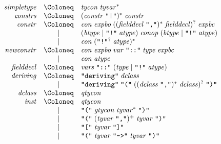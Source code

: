 \begin{align*}
  \begin{array}{rcl}
    \mathit{simpletype}
    & \Coloneq & \mathit{tycon}\; \mathit{tyvar}^* \\
    \mathit{constrs}
    & \Coloneq & (\mathit{constr}\; \text{\texttt{\textquotedbl|\textquotedbl}})^*\; \mathit{constr} \\
    \mathit{constr}
    & \Coloneq & \mathit{con}\; \mathit{expbo}\; ((\mathit{fielddecl}\; \text{\texttt{\textquotedbl,\textquotedbl}})^*\; \mathit{fielddecl})^?\; \mathit{expbc} \\
    & \mid & (\mathit{btype} \mid \text{\texttt{\textquotedbl!\textquotedbl}}\; \mathit{atype})\; \mathit{conop}\; (\mathit{btype} \mid \text{\texttt{\textquotedbl!\textquotedbl}}\; \mathit{atype}) \\
    & \mid & \mathit{con}\; (\text{\texttt{\textquotedbl!\textquotedbl}}^?\; \mathit{atype})^* \\
    \mathit{newconstr}
    & \Coloneq & \mathit{con}\; \mathit{expbo}\; \mathit{var}\; \text{\texttt{\textquotedbl ::\textquotedbl}}\; \mathit{type}\; \mathit{expbc} \\
    & \mid & \mathit{con}\; \mathit{atype} \\
    \mathit{fielddecl}
    & \Coloneq & \mathit{vars}\; \text{\texttt{\textquotedbl ::\textquotedbl}}\; (\mathit{type} \mid \text{\texttt{\textquotedbl !\textquotedbl}}\; \mathit{atype}) \\
    \mathit{deriving}
    & \Coloneq & \text{\texttt{\textquotedbl deriving\textquotedbl}}\; \mathit{dclass} \\
    & \mid & \text{\texttt{\textquotedbl deriving\textquotedbl}}\; \text{\texttt{\textquotedbl(\textquotedbl}}\; ((\mathit{dclass}\; \text{\texttt{\textquotedbl,\textquotedbl}})^*\; \mathit{dclass})^?\; \text{\texttt{\textquotedbl)\textquotedbl}} \\
    \mathit{dclass}
    & \Coloneq & \mathit{qtycon} \\
    \mathit{inst}
    & \Coloneq & \mathit{qtycon} \\
    & \mid & \text{\texttt{\textquotedbl(\textquotedbl}}\; \mathit{gtycon}\; \mathit{tyvar}^*\; \text{\texttt{\textquotedbl)\textquotedbl}} \\
    & \mid & \text{\texttt{\textquotedbl(\textquotedbl}}\; (\mathit{tyvar}\; \text{\texttt{\textquotedbl,\textquotedbl}})^+\; \mathit{tyvar}\; \text{\texttt{\textquotedbl)\textquotedbl}} \\
    & \mid & \text{\texttt{\textquotedbl[\textquotedbl}}\; \mathit{tyvar}\; \text{\texttt{\textquotedbl]\textquotedbl}} \\
    & \mid & \text{\texttt{\textquotedbl(\textquotedbl}}\; \mathit{tyvar}\; \text{\texttt{\textquotedbl ->\textquotedbl}}\; \mathit{tyvar}\; \text{\texttt{\textquotedbl)\textquotedbl}}
  \end{array}
\end{align*}

